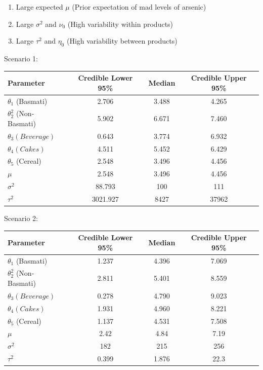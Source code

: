 \documentclass[]{article}
\begin{document}
\begin{enumerate}
  \item Large expected $\mu$ (Prior expectation of mad levels of arsenic)
  \item Large $\sigma^2$ and $\nu_0$ (High variability within products)
  \item Large $\tau^2$ and $\eta_0$ (High variability between products)
\end{enumerate}

Scenario 1:

\begin{center}
  \begin{tabular}{l c c c}
  \hline Parameter & Credible Lower 95\% & Median & Credible Upper 95\%  \\ \hline
    $\theta_1$ (Basmati)&2.706&3.488&4.265\\
    $\theta_2^2$ (Non-Basmati)&5.902&6.671&7.460\\
    $\theta_3 (Beverage)$&0.643&3.774&6.932\\
    $\theta_4 (Cakes)$&4.511&5.452&6.429\\
    $\theta_5$ (Cereal)&2.548&3.496&4.456\\
    $\mu$ &2.548&3.496&4.456\\
    $\sigma^2$ &88.793&100&111\\
    $\tau^2$ &3021.927&8427&37962\\ \hline
  \end{tabular}
\end{center}

Scenario 2:

\begin{center}
  \begin{tabular}{l c c c}
  \hline Parameter & Credible Lower 95\% & Median & Credible Upper 95\% \\ \hline
    $\theta_1$ (Basmati)& 1.237 & 4.396 & 7.069\\
    $\theta_2^2$ (Non-Basmati)& 2.811 & 5.401 & 8.559 \\
    $\theta_3 (Beverage)$& 0.278 & 4.790 & 9.023 \\
    $\theta_4 (Cakes)$& 1.931 & 4.960 & 8.221\\
    $\theta_5$ (Cereal)& 1.137 & 4.531 & 7.508\\
    $\mu$ &2.42 & 4.84 & 7.19\\
    $\sigma^2$ &182 & 215& 256\\
    $\tau^2$ &0.399 & 1.876 & 22.3\\ \hline

  \end{tabular}
\end{center}
\end{document}
